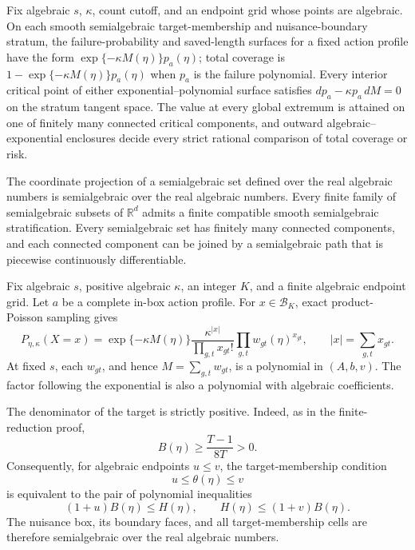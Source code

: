 Fix algebraic \(s\), \(\kappa\), count cutoff, and an endpoint grid whose points are algebraic.  On each smooth semialgebraic target-membership and nuisance-boundary stratum, the failure-probability and saved-length surfaces for a fixed action profile have the form \(\exp\{-\kappa M(\eta)\}p_a(\eta)\); total coverage is \(1-\exp\{-\kappa M(\eta)\}p_a(\eta)\) when \(p_a\) is the failure polynomial.  Every interior critical point of either exponential--polynomial surface satisfies \(dp_a-\kappa p_a\,dM=0\) on the stratum tangent space.  The value at every global extremum is attained on one of finitely many connected critical components, and outward algebraic--exponential enclosures decide every strict rational comparison of total coverage or risk.

The coordinate projection of a semialgebraic set defined over the real algebraic numbers is semialgebraic over the real algebraic numbers.  Every finite family of semialgebraic subsets of \(\mathbb R^d\) admits a finite compatible smooth semialgebraic stratification.  Every semialgebraic set has finitely many connected components, and each connected component can be joined by a semialgebraic path that is piecewise continuously differentiable.

Fix algebraic \(s\), positive algebraic \(\kappa\), an integer \(K\), and a finite algebraic endpoint grid.  Let \(a\) be a complete in-box action profile.  For \(x\in\mathcal B_K\), exact product-Poisson sampling gives
\[
 P_{\eta,\kappa}(X=x)
 =\exp\{-\kappa M(\eta)\}
   \frac{\kappa^{|x|}}{\prod_{g,t}x_{gt}!}
   \prod_{g,t}w_{gt}(\eta)^{x_{gt}},
 \qquad
 |x|=\sum_{g,t}x_{gt}.
\]
At fixed \(s\), each \(w_{gt}\), and hence \(M=\sum_{g,t}w_{gt}\), is a polynomial in \((A,b,v)\).  The factor following the exponential is also a polynomial with algebraic coefficients.

The denominator of the target is strictly positive.  Indeed, as in the finite-reduction proof,
\[
 B(\eta)\ge\frac{T-1}{8T}>0.
\]
Consequently, for algebraic endpoints \(u\le v\), the target-membership condition
\[
 u\le\theta(\eta)\le v
\]
is equivalent to the pair of polynomial inequalities
\[
 (1+u)B(\eta)\le H(\eta),
 \qquad
 H(\eta)\le(1+v)B(\eta).
\]
The nuisance box, its boundary faces, and all target-membership cells are therefore semialgebraic over the real algebraic numbers.

